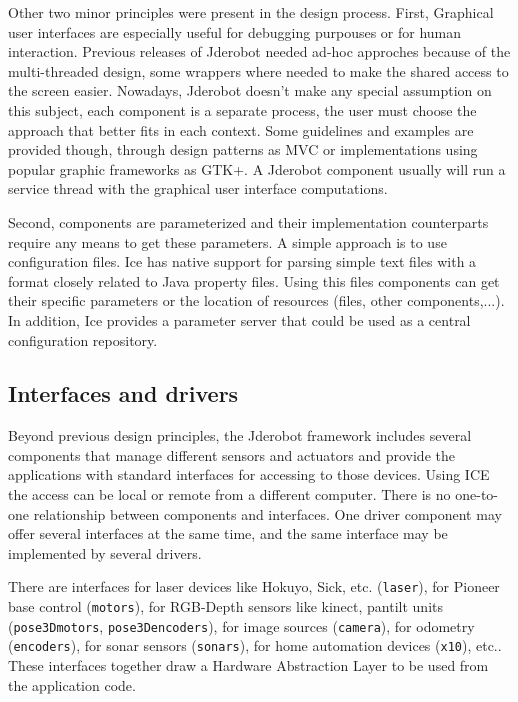 \documentclass[twocolumn]{svjour3}          %
\begin{document}
Other two minor principles were present in the design process. First, Graphical user interfaces are especially useful for debugging purpouses or for human interaction. Previous releases of Jderobot needed ad-hoc approches because of the multi-threaded design, some wrappers where needed to make the shared access to the screen easier. Nowadays, Jderobot doesn't make any special assumption on this subject, each component is a separate process, the user must choose the approach that better fits in each context. Some guidelines and examples are provided though, through design patterns as MVC or implementations using popular graphic frameworks as GTK+. A Jderobot component usually will run a service thread with the graphical user interface computations. 

Second, components are parameterized and their implementation counterparts require any means to get these parameters. A simple approach is to use configuration files. Ice has native support for parsing simple text files with a format closely related to Java property files. Using this files components can get their specific parameters or the location of resources (files, other components,...). In addition, Ice provides a parameter server that could be used as a central configuration repository.

\subsection{Interfaces and drivers}
\label{sec:drivers}

Beyond previous design principles, the Jderobot framework includes several components that manage different sensors and actuators and provide the applications with standard interfaces for accessing to those devices. Using ICE the access can be local or remote from a different computer. There is no one-to-one relationship between components and interfaces. One driver component may offer several interfaces at the same time, and the same interface may be implemented by several drivers.

There are interfaces for laser devices like Hokuyo, Sick, etc. (\texttt{laser}), for Pioneer base control (\texttt{motors}), for RGB-Depth sensors like kinect, pantilt units (\texttt{pose3Dmotors}, \texttt{pose3Dencoders}), for image sources (\texttt{camera}), for odometry (\texttt{encoders}), for sonar sensors (\texttt{sonars}), for home automation devices (\texttt{x10}), etc.. These interfaces together draw a Hardware Abstraction Layer to be used from the application code. 
\end{document}
